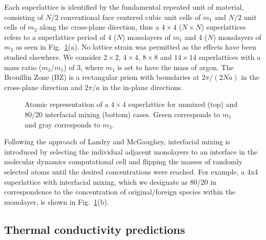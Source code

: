 Each superlattice is identified by the fundamental repeated unit of material, consisting of $N/2$ conventional face centered cubic unit cells of $m_1$ and $N/2$ unit cells of $m_3$ along the cross-plane direction, thus a $4\times4$ ($N\times N$) superlattices refers to a superlattice period of 4 ($N$) monolayers of $m_1$ and 4 ($N$) monolayers of $m_3$ as seen in Fig.~\ref{fig:md_domain}(a). No lattice strain was permitted as the effects have been studied elsewhere.\cite{PhysRevB.72.174302}  We consider $2\times2$, $4\times4$, $8\times8$ and $14\times14$ superlattices with a mass ratio ($m_3/m_1$) of 3, where $m_1$ is set to have the mass of argon. The Brouillin Zone (BZ) is a rectangular prism with boundaries at $2\pi/(2Na)$ in the cross-plane direction and $2\pi/a$ in the in-plane directions.
\begin{figure}[ht!]
\begin{center}
\renewcommand{\figure}{Fig.}
\caption{Atomic representation of a $4\times4$ superlattice for unmixed (top) and 80/20 interfacial mixing (bottom) cases. Green corresponds to $m_1$ and gray corresponds to $m_3$.}
\label{fig:md_domain}
\end{center}
\end{figure}

Following the approach of Landry and McGaughey,\cite{PhysRevB.79.075316} interfacial mixing is introduced by selecting the individual adjacent monolayers to an interface in the molecular dynamics computational cell and flipping the masses of randomly selected atoms until the desired concentrations were reached. For example, a 4x4 superlattice with interfacial mixing, which we designate as 80/20 in correspondence to the concentration of original/foreign species within the monolayer, is shown in Fig.~\ref{fig:md_domain}(b).

\subsection{Thermal conductivity predictions}
